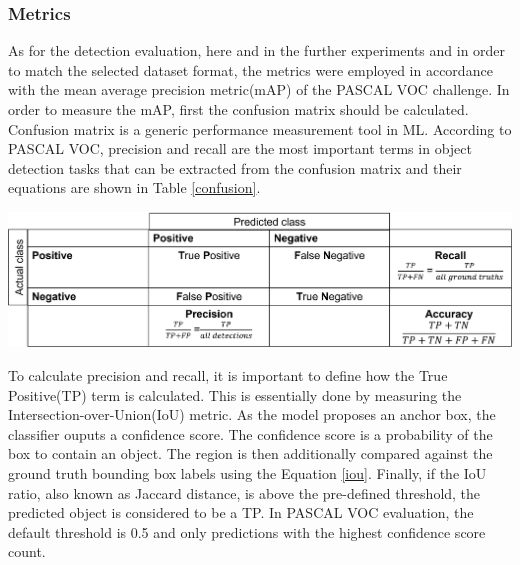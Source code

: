 \documentclass[english, 12pt, a4paper, elec, utf8, a-1b, online]{aaltothesis}
\begin{document}
\subsubsection{Metrics}
\label{metrics_section} 

As for the detection evaluation, here and in the further experiments and in order to match the selected dataset format, the metrics were employed in accordance with the mean average precision metric(mAP) of the PASCAL VOC \cite{Everingham10} challenge. In order to measure the mAP, first the confusion matrix should be calculated. Confusion matrix is a generic performance measurement tool in ML. According to PASCAL VOC, precision and recall are the most important terms in object detection tasks that can be extracted from the confusion matrix and their equations are shown in Table \ref{confusion}.

\begin{table}[htb]
	\begin{center}
		\includegraphics[width=14cm]{./confusion.png}
	\end{center}
	\begin{center}
		\label{confusion}
	\end{center}
\end{table}
\FloatBarrier


To calculate precision and recall, it is important to define how the True Positive(TP) term is calculated. This is essentially done by measuring the  Intersection-over-Union(IoU) metric. As the model proposes an anchor box, the classifier ouputs a confidence score. The confidence score is a probability of the box to contain an object. The region is then additionally compared against the ground truth bounding box labels using the Equation \ref{iou}. Finally, if the IoU ratio, also known as Jaccard distance, is above the pre-defined threshold, the predicted object is considered to be a TP. In PASCAL VOC evaluation, the default threshold is 0.5 \cite{mAp_blog} and only predictions with the highest confidence score count. 
\end{document}
